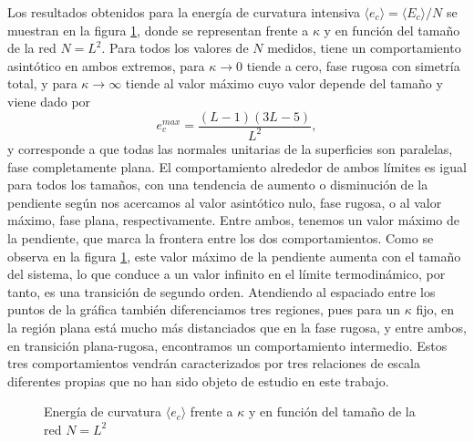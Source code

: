 Los resultados obtenidos para la energía de curvatura intensiva $\langle
e_c\rangle=\langle E_c\rangle/N$ se muestran en la figura \ref{Ec_fig}, donde
se representan frente a $\kappa$ y en función del tamaño de la red
$N=L^2$. Para todos los valores de $N$ medidos, tiene un comportamiento
asintótico en ambos extremos, para $\kappa\rightarrow 0$ tiende a cero, fase
rugosa con simetría total, y para $\kappa\rightarrow \infty$ tiende al valor
máximo cuyo valor depende del tamaño y viene dado por 
\begin{equation}
e^{max}_c = \frac{(L-1)(3L-5)}{L^2},
\end{equation}
y corresponde a que todas las normales unitarias de la superficies son
paralelas, fase completamente plana. El comportamiento alrededor de ambos
límites es igual para todos los tamaños, con una tendencia de aumento o
disminución de la pendiente según nos acercamos al valor asintótico nulo, fase
rugosa, o al valor máximo, fase plana, respectivamente. Entre ambos, tenemos un valor máximo de
la pendiente, que marca la frontera entre los dos comportamientos. Como se
observa en la figura \ref{Ec_fig}, este valor máximo de la pendiente aumenta
con el tamaño del sistema, lo que conduce a un valor infinito en el límite
termodinámico, por tanto, es una transición de segundo orden. Atendiendo al
espaciado entre los puntos de la gráfica también diferenciamos tres regiones, pues para un
$\kappa$ fijo, en la región plana está mucho más distanciados que en la fase
rugosa, y entre ambos, en transición plana-rugosa, encontramos un
comportamiento intermedio. Estos tres comportamientos vendrán caracterizados por tres
relaciones de escala diferentes propias que no han sido objeto de estudio en
este trabajo.

\begin{figure}[h]
\centering
 
\caption{Energía de curvatura $\langle e_c\rangle$ frente a $\kappa$ y en función del tamaño de la red
$N=L^2$}\label{Ec_fig}
\end{figure}

